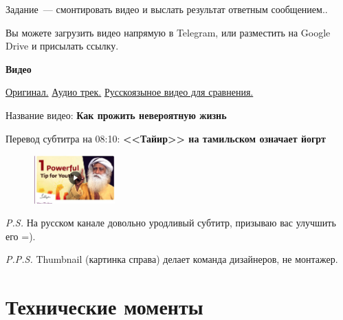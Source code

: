 \documentclass[
a4paper, %
12pt, %
article,
onecolumn, %
openany, %
]{memoir}
\begin{document}
Задание~--- смонтировать видео и выслать результат
ответным сообщением.. 

Вы можете загрузить видео напрямую в Telegram, или разместить
на Google Drive и присылать ссылку.

\begin{center} \textbf{Видео} \end{center}
\href{https://www.youtube.com/watch?v=9sGJUR7stzc}{Оригинал.}
\quad
\href{https://drive.google.com/file/d/1Y6ECjMSvkaUFmNawIePfFvqS2ZnB3SPi/view?usp=sharing}{Аудио трек.}
\quad
\href{https://www.youtube.com/watch?v=Q3NYDF4JyTg}{Русскоязыное видео для сравнения.}

Название видео: \textbf{Как прожить невероятную жизнь}
	
Перевод субтитра на 08:10: \textbf{<<Тайир>> на тамильском означает йогрт}


\begin{figure}
  \begin{center}
    \includegraphics[width=0.28\textwidth]{thumbnail}
  \end{center}
\end{figure}

\emph{P.S.} На русском канале довольно уродливый субтитр, призываю вас улучшить его =).

\emph{P.P.S.} Thumbnail (картинка справа) делает команда дизайнеров, не монтажер.
 

\newpage
\section{Технические моменты}
\end{document}
